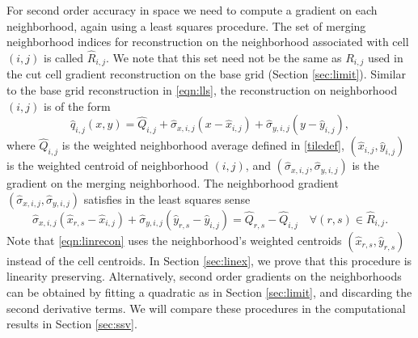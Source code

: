 For second order accuracy in space we need to compute a gradient on each 
neighborhood, again  using a least squares procedure.
The set of merging neighborhood indices for reconstruction on the
neighborhood associated with cell $(i,j)$ is called $\widehat R_{i,j}$.
We note that this set need not be the same as $R_{i,j}$ used in the cut cell gradient reconstruction on the base grid (Section \ref{sec:limit}). 
Similar to the base grid reconstruction in \eqref{eqn:lls}, the reconstruction on neighborhood $(i,j)$ is of the form
\begin{equation}\label{eq:qrecon}
\widehat{q}_{i,j}(x,y) = \widehat{Q}_{i, j} + \widehat{\sigma}_{x,i,j}(x - \widehat{x}_{i,j}) + \widehat{\sigma}_{y,i,j}(y - \widehat{y}_{i,j}),
\end{equation}
where $\widehat{Q}_{i, j}$ is the weighted neighborhood average defined in \eqref{tiledef}, $(\widehat{x}_{i,j},\widehat{y}_{i,j})$ is the weighted centroid of neighborhood $(i,j)$, and $(\widehat{\sigma}_{x,i,j},\widehat{\sigma}_{y,i,j})$ is 
the gradient on the merging neighborhood.
The neighborhood gradient $(\widehat{\sigma}_{x,i,j},\widehat{\sigma}_{y,i,j})$ satisfies in the least squares sense
\begin{equation}\label{eqn:linrecon}
\widehat{\sigma}_{x,i,j}(\widehat{x}_{r,s} - \widehat{x}_{i,j}) +
\widehat{\sigma}_{y,i,j}(\widehat{y}_{r,s} - \widehat{y}_{i,j})=
\widehat{Q}_{r,s} - \widehat{Q}_{i, j} \quad \forall (r,s) \in \widehat{R}_{i,j}.
\end{equation}
Note that \eqref{eqn:linrecon} uses the neighborhood's weighted centroids $(\widehat{x}_{r,s},\widehat{y}_{r,s})$ instead of the cell centroids.  In Section \ref{sec:linex}, we prove that this procedure is linearity preserving.
Alternatively, second order gradients on the neighborhoods can be obtained by fitting a quadratic
as in Section \ref{sec:limit}, and discarding the second derivative terms.
We will compare these procedures in the computational results in Section \ref{sec:ssv}.





